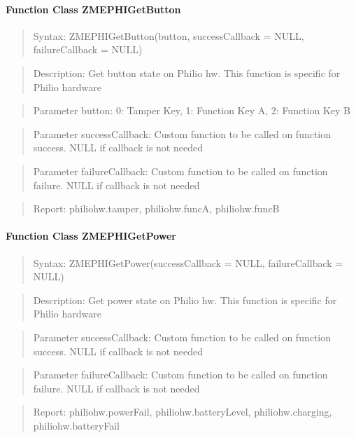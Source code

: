 \paragraph{Function Class ZMEPHIGetButton}
\begin{quote}Syntax: ZMEPHIGetButton(button, successCallback = NULL, failureCallback = NULL)\end{quote}
\begin{quote}Description: Get button state on Philio hw. This function is specific for Philio hardware\end{quote}
\begin{quote}Parameter button: 0: Tamper Key, 1: Function Key A, 2: Function Key B\end{quote}
\begin{quote}Parameter successCallback: Custom function to be called on function success. NULL if callback is not needed\end{quote}
\begin{quote}Parameter failureCallback: Custom function to be called on function failure. NULL if callback is not needed\end{quote}
\begin{quote}Report: philiohw.tamper, philiohw.funcA, philiohw.funcB\end{quote}

\paragraph{Function Class ZMEPHIGetPower}
\begin{quote}Syntax: ZMEPHIGetPower(successCallback = NULL, failureCallback = NULL)\end{quote}
\begin{quote}Description: Get power state on Philio hw. This function is specific for Philio hardware\end{quote}
\begin{quote}Parameter successCallback: Custom function to be called on function success. NULL if callback is not needed\end{quote}
\begin{quote}Parameter failureCallback: Custom function to be called on function failure. NULL if callback is not needed\end{quote}
\begin{quote}Report: philiohw.powerFail, philiohw.batteryLevel, philiohw.charging, philiohw.batteryFail\end{quote}

